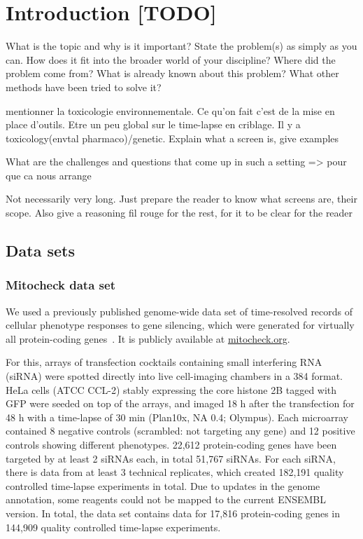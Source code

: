 \chapter{Introduction [TODO]}
What is the topic and why is it important? State the problem(s) as simply as you can. How does it fit into the broader world of your discipline? 
Where did the problem come from? What is already known about this problem? What other methods have been tried to solve it? 


mentionner la toxicologie environnementale. Ce qu'on fait c'est de la mise en place d'outils. Etre un peu global sur le time-lapse en criblage. Il y a toxicology(envtal pharmaco)/genetic. Explain what a screen is, give examples

What are the challenges and questions that come up in such a setting => pour que ca nous arrange

Not necessarily very long. Just prepare the reader to know what screens are, their scope. Also give a reasoning fil rouge for the rest, for it to be clear for the reader
\section{Data sets}
\subsection{Mitocheck data set}

We used a previously published genome-wide data set of time-resolved
records of cellular phenotype responses to gene silencing, which
were generated for virtually all protein-coding genes~\cite{pmid20360735}. It is publicly available at
\href{http://www.mitocheck.org}{mitocheck.org}. 

For this, arrays of transfection cocktails containing small interfering RNA (siRNA) were spotted directly into live cell-imaging chambers in a 384 format. HeLa cells (ATCC\up{\textregistered} CCL-2\texttrademark) stably expressing the core histone 2B tagged with GFP were seeded on top of the arrays, and imaged 18 h after the transfection for 48 h with a time-lapse of 30 min (Plan10x, NA 0.4; Olympus). Each microarray contained 8 negative controls (scrambled: not targeting any gene) and 12 positive controls showing different phenotypes. 
22,612 protein-coding genes have been targeted by at least 2 siRNAs each, in total 51,767 siRNAs. For each siRNA, there is data from at least 3 technical replicates, which created 182,191 quality controlled time-lapse experiments in total. Due to updates in the genome annotation, some reagents could not be mapped to the current ENSEMBL version. In total, the data set contains data for 17,816 protein-coding genes in 144,909 quality controlled time-lapse
experiments.  

